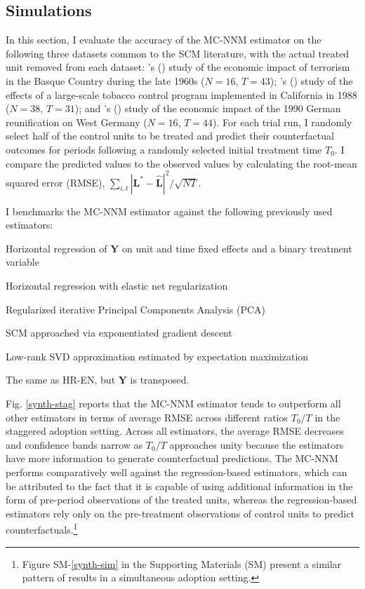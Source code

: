 \documentclass[12pt]{article}
\newcommand{\possessivecite}[1]{\citeauthor{#1}'s (\citeyear{#1})}
\begin{document}
\subsection{Simulations} \label{sims}

In this section, I evaluate the accuracy of the MC-NNM estimator on the following three datasets common to the SCM literature, with the actual treated unit removed from each dataset: \possessivecite{abadie2003economic} study of the economic impact of terrorism in the Basque Country during the late 1960s ($N=16$, $T=43$); \possessivecite{abadie2010synthetic} study of the effects of a large-scale tobacco control program implemented in California in 1988 ($N=38$, $T=31$); and \possessivecite{abadie2015comparative} study of the economic impact of the 1990 German reunification on West Germany ($N=16$, $T=44$). For each trial run, I randomly select half of the control units to be treated and predict their counterfactual outcomes for periods following a randomly selected initial treatment time $T_0$. I compare the predicted values to the observed values by calculating the root-mean squared error (RMSE), $\sum_{i,t}|\mathbf{L^{*}} -\hat{\mathbf{L}}|^2 / \sqrt{NT}$. 

I benchmarks the MC-NNM estimator against the following previously used estimators:

\begin{description}
	{\setlength\itemindent{1mm}
		\item[DID] Horizontal regression of $\mathbf{Y}$ on unit and time fixed effects and a binary treatment variable \citep{athey2017matrix}
		\item[HR-EN] Horizontal regression with elastic net regularization \citep{athey2017matrix} 
		\item[PCA] Regularized iterative Principal Components Analysis (PCA) \citep{ilin2010practical,josse2012handling}
		\item[SC-ADH] SCM approached via exponentiated gradient descent \citep{abadie2010synthetic}
		\item[SVD] Low-rank SVD approximation estimated by expectation maximization \citep{troyanskaya2001missing}
		\item[VT-EN] The same as HR-EN, but $\mathbf{Y}$ is transposed.
	}
\end{description}
%
Fig. \ref{synth-stag} reports that the MC-NNM estimator tends to outperform all other estimators in terms of average RMSE across different ratios $T_0/T$ in the staggered adoption setting. Across all estimators, the average RMSE decreases and confidence bands narrow as $T_0/T$ approaches unity because the estimators have more information to generate counterfactual predictions. The MC-NNM performs comparatively well against the regression-based estimators, which can be attributed to the fact that it is capable of using additional information in the form of pre-period observations of the treated units, whereas the regression-based estimators rely only on the pre-treatment observations of control units to predict counterfactuals.\footnote{Figure SM-\ref{synth-sim} in the Supporting Materials (SM) present a similar pattern of results in a simultaneous adoption setting.}
\end{document}
